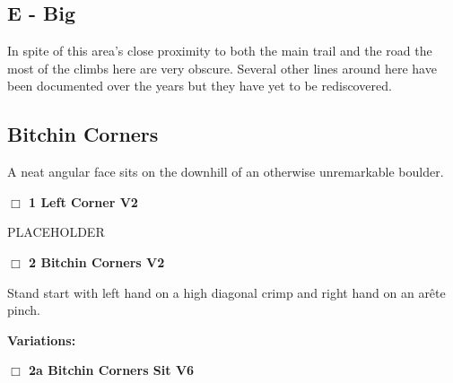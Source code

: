 \begin{multicols}{2}
\section{E - Big}\label{sa:Big}

In spite of this area's close proximity to both the main trail and the road the most of the climbs here are very obscure. Several other lines around here have been documented over the years but they have yet to be rediscovered.\\




\needspace{10em}
\subsection*{Bitchin Corners}\label{bf:Bitchin Corners}

A neat angular face sits on the downhill of an otherwise unremarkable boulder.\\



\needspace{2em}
\label{rt:Left Corner}
\colorbox{green!20}{
\parbox{0.95\linewidth}{
\hspace{-1ex}\textbf{$\Box$
1 Left Corner V2  
}}}
\begin{adjustwidth}{1.3em}{}			

PLACEHOLDER
\end{adjustwidth}




\needspace{2em}
\label{rt:Bitchin Corners}
\colorbox{green!20}{
\parbox{0.95\linewidth}{
\hspace{-1ex}\textbf{$\Box$
2 Bitchin Corners V2  
}}}
\begin{adjustwidth}{1.3em}{}			

Stand start with left hand on a high diagonal crimp and right hand on an arête pinch.
\end{adjustwidth}


\begin{adjustwidth}{0.5cm}{}				
\needspace{4em}
\textbf{Variations:} \newline

\needspace{2em}
\label{vr:Bitchin Corners Sit}
\colorbox{RoyalBlue!20}{
\parbox{0.95\linewidth}{
\hspace{-1ex}\textbf{$\Box$
2a Bitchin Corners Sit V6  
}}}
\begin{adjustwidth}{1.3em}{}			


\end{adjustwidth}
\end{adjustwidth}
\end{multicols}

